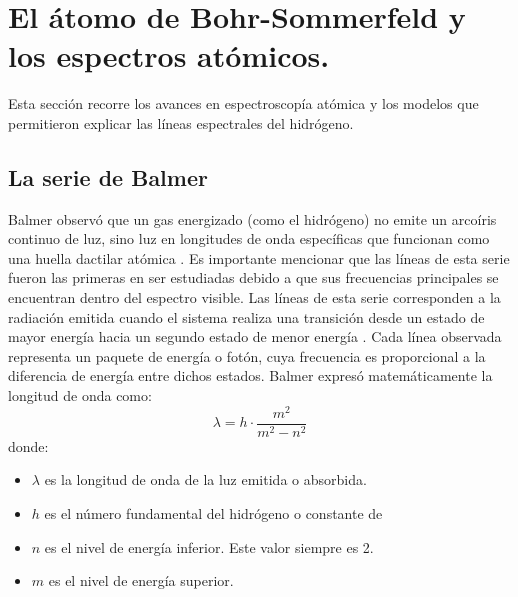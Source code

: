 \documentclass[11pt,a4paper,spanish]{book}
\begin{document}
\section{El átomo de Bohr-Sommerfeld y los espectros atómicos.}
Esta sección recorre los avances en espectroscopía atómica y los
modelos que permitieron explicar las líneas espectrales del hidrógeno.

\subsection{La serie de Balmer}
Balmer observó que un gas energizado (como el hidrógeno) no emite
un arcoíris continuo de luz,
sino luz en longitudes de onda específicas que funcionan como una
huella dactilar atómica \citep{balmer1885}. Es importante mencionar que
las líneas de esta serie fueron las primeras en ser estudiadas debido
a que sus frecuencias principales se encuentran dentro del espectro visible.
Las líneas de esta serie corresponden a la radiación emitida cuando
el sistema realiza una transición desde un estado de mayor energía
hacia un segundo estado de menor energía \citep{balmer1885}. Cada línea
observada representa un paquete de energía o fotón, cuya frecuencia
es proporcional a la diferencia de energía entre dichos estados.
Balmer expresó matemáticamente la longitud de onda como:
\begin{equation}
  \lambda = h \cdot \frac{m^2}{m^2 - n^2}
\end{equation}
donde:
\begin{itemize}[nosep]
  \item $\lambda$ es la longitud de onda de la luz emitida o absorbida.
  \item $h$ es el número fundamental del hidrógeno o constante de
    \citet{balmer1885}
  \item $n$ es el nivel de energía inferior. Este valor siempre es 2.
  \item $m$ es el nivel de energía superior.
\end{itemize}
\end{document}
